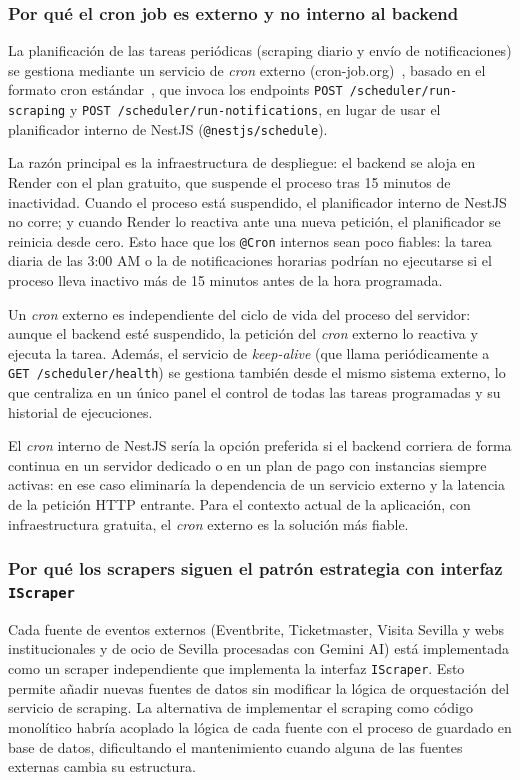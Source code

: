 \subsubsection{Por qué el cron job es externo y no interno al backend}

La planificación de las tareas periódicas (scraping diario y envío de notificaciones) se gestiona mediante un servicio de \textit{cron} externo (cron-job.org)~\cite{cronjoborg}, basado en el formato cron estándar~\cite{posixcron}, que invoca los endpoints \texttt{POST /scheduler/run-scraping} y \texttt{POST /scheduler/run-notifications}, en lugar de usar el planificador interno de NestJS (\texttt{@nestjs/schedule}).

La razón principal es la infraestructura de despliegue: el backend se aloja en Render con el plan gratuito, que suspende el proceso tras 15 minutos de inactividad. Cuando el proceso está suspendido, el planificador interno de NestJS no corre; y cuando Render lo reactiva ante una nueva petición, el planificador se reinicia desde cero. Esto hace que los \texttt{@Cron} internos sean poco fiables: la tarea diaria de las 3:00 AM o la de notificaciones horarias podrían no ejecutarse si el proceso lleva inactivo más de 15 minutos antes de la hora programada.

Un \textit{cron} externo es independiente del ciclo de vida del proceso del servidor: aunque el backend esté suspendido, la petición del \textit{cron} externo lo reactiva y ejecuta la tarea. Además, el servicio de \textit{keep-alive} (que llama periódicamente a \texttt{GET /scheduler/health}) se gestiona también desde el mismo sistema externo, lo que centraliza en un único panel el control de todas las tareas programadas y su historial de ejecuciones.

El \textit{cron} interno de NestJS sería la opción preferida si el backend corriera de forma continua en un servidor dedicado o en un plan de pago con instancias siempre activas: en ese caso eliminaría la dependencia de un servicio externo y la latencia de la petición HTTP entrante. Para el contexto actual de la aplicación, con infraestructura gratuita, el \textit{cron} externo es la solución más fiable.

\subsubsection{Por qué los scrapers siguen el patrón estrategia con interfaz \texttt{IScraper}}

Cada fuente de eventos externos (Eventbrite, Ticketmaster, Visita Sevilla y webs institucionales y de ocio de Sevilla procesadas con Gemini AI) está implementada como un scraper independiente que implementa la interfaz \texttt{IScraper}. Esto permite añadir nuevas fuentes de datos sin modificar la lógica de orquestación del servicio de scraping. La alternativa de implementar el scraping como código monolítico habría acoplado la lógica de cada fuente con el proceso de guardado en base de datos, dificultando el mantenimiento cuando alguna de las fuentes externas cambia su estructura.

